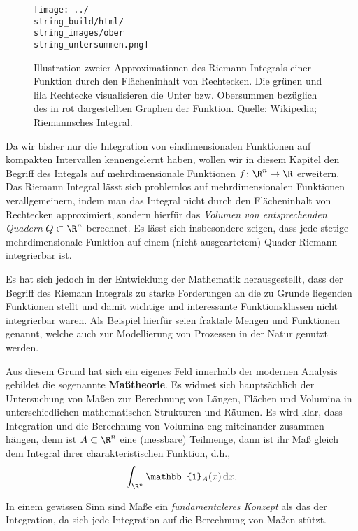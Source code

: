 \documentclass[letterpaper,10pt,english]{jupyterBook}
\begin{document}
\begin{figure}[htbp]
\centering


\noindent\texttt{[image: ../\\string\_build/html/\\string\_images/ober\\string\_untersummen.png]}
\caption{Illustration zweier Approximationen des Riemann Integrals einer Funktion durch den Flächeninhalt von Rechtecken. Die grünen und lila Rechtecke visualisieren die Unter  bzw. Obersummen bezüglich des in rot dargestellten Graphen der Funktion. Quelle: \href{https://de.wikipedia.org/wiki/Riemannsches\_Integral}{Wikipedia; Riemannsches Integral}.}\label{\detokenize{masstheorie/intro_masstheorie:fig-riemann-integral}}\end{figure}

\par
Da wir bisher nur die Integration von eindimensionalen Funktionen auf kompakten Intervallen kennengelernt haben, wollen wir in diesem Kapitel den Begriff des Integals auf mehrdimensionale Funktionen \(f \colon \R^n \rightarrow \R\) erweitern.
Das Riemann Integral lässt sich problemlos auf mehrdimensionalen Funktionen verallgemeinern, indem man das Integral nicht durch den Flächeninhalt von Rechtecken approximiert, sondern hierfür das \emph{Volumen von entsprechenden Quadern} \(Q \subset \R^n\) berechnet.
Es lässt sich insbesondere zeigen, dass jede stetige mehrdimensionale Funktion auf einem (nicht ausgeartetem) Quader Riemann integrierbar ist.

\par
Es hat sich jedoch in der Entwicklung der Mathematik herausgestellt, dass der Begriff des Riemann Integrals zu starke Forderungen an die zu Grunde liegenden Funktionen stellt und damit wichtige und interessante Funktionsklassen nicht integrierbar waren.
Als Beispiel hierfür seien \href{https://de.wikipedia.org/wiki/Fraktal}{fraktale Mengen und Funktionen} genannt, welche auch zur Modellierung von Prozessen in der Natur genutzt werden.

\par
Aus diesem Grund hat sich ein eigenes Feld innerhalb der modernen Analysis gebildet   die sogenannte \textbf{Maßtheorie}.
Es widmet sich hauptsächlich der Untersuchung von Maßen zur Berechnung von Längen, Flächen und Volumina in unterschiedlichen mathematischen Strukturen und Räumen.
Es wird klar, dass Integration und die Berechnung von Volumina eng miteinander zusammen hängen, denn ist \(A\subset\R^n\) eine (messbare) Teilmenge, dann ist ihr Maß gleich dem Integral ihrer charakteristischen Funktion, d.h.,
\begin{align*}
\int_{\R^n} \mathbb{1}_A(x)\,\mathrm{d}x.
\end{align*}
\par
In einem gewissen Sinn sind Maße ein \emph{fundamentaleres Konzept} als das der Integration, da sich jede Integration auf die Berechnung von Maßen stützt.
\end{document}
